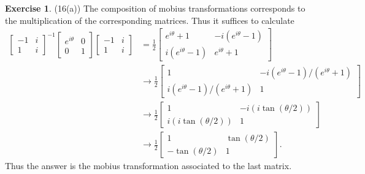 \documentclass[12pt, psamsfonts]{amsart}
\theoremstyle{definition}
\newtheorem*{exer}{Exercise}
\theoremstyle{remark}
\numberwithin{equation}{section}
\begin{document}
\begin{exer}{(16(a))}
  The composition of mobius transformations corresponds to the multiplication of the corresponding matrices.
  Thus it suffices to calculate
  \begin{align*}
    \begin{bmatrix}
      -1 & i \\
      1 & i
    \end{bmatrix}^{-1}
    \begin{bmatrix}
      e^{i\theta} & 0 \\
      0 & 1
    \end{bmatrix}
    \begin{bmatrix}
      -1 & i \\
      1 & i
    \end{bmatrix}
    &= \frac{1}{2} \begin{bmatrix} e^{i\theta} + 1 & -i(e^{i\theta} - 1) \\ i(e^{i\theta} - 1) & e^{i\theta} + 1 \end{bmatrix} \\
    &\rightarrow \frac{1}{2} \begin{bmatrix} 1 & -i(e^{i\theta} - 1) / (e^{i\theta} + 1) \\ i(e^{i\theta} - 1) / (e^{i\theta} + 1)  & 1 \end{bmatrix} \\
    &\rightarrow \frac{1}{2} \begin{bmatrix} 1 & -i(i\tan(\theta / 2))  \\ i(i\tan(\theta / 2))  & 1 \end{bmatrix} \\
    &\rightarrow \frac{1}{2} \begin{bmatrix} 1 & \tan(\theta / 2)  \\ -\tan(\theta / 2)  & 1 \end{bmatrix}.
  \end{align*}
  Thus the answer is the mobius transformation associated to the last matrix.
\end{exer}
\end{document}
